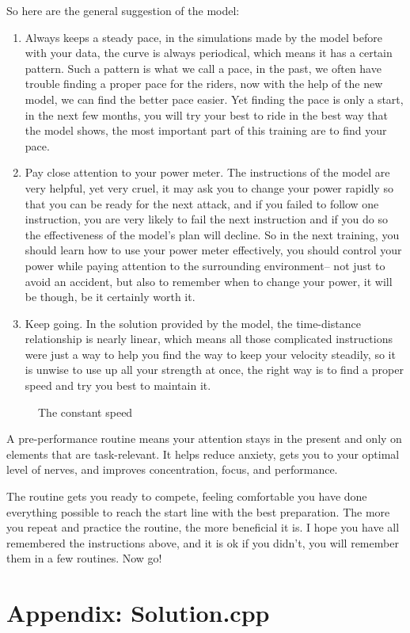 \documentclass[12pt]{article}
\begin{document}
So here are the general suggestion of the model:
\begin{enumerate}
    \item Always keeps a steady pace, in the simulations made by the model before with your data, the curve is always periodical, which means it has a certain pattern. Such a
          pattern is what we call a pace, in the past, we often have trouble finding a proper pace for the riders, now with the help of the new model, we can find the
          better pace easier. Yet finding the pace is only a start, in the next few months, you will try your best to ride in the best way that the model shows, the most important part of this training are to find your pace.
    \item  Pay close attention to your power meter. The instructions of the model are very helpful, yet very cruel, it may ask you to change your
          power rapidly so that you can be ready for the next attack, and if you failed to follow one instruction, you are very likely to fail the next instruction and if you do so
          the effectiveness of the model's plan will decline.  So in the next training, you should learn how to use your power meter effectively, you should control your power while
          paying attention to the surrounding environment-- not just to avoid an accident, but also to remember when to change your power, it will be though, be it certainly worth it.
    \item Keep going. In the solution provided by the model, the time-distance relationship is nearly linear, which means all those complicated instructions were just a way to help
          you find the way to keep your velocity steadily, so it is unwise to use up all your strength at once, the right way is to find a proper speed and try you best to maintain
          it.
\end{enumerate}

\begin{figure}[H]
    \centering

    \caption{The constant speed}
\end{figure}
A pre-performance routine means your attention stays in the present and only on elements that are task-relevant. It helps reduce anxiety, gets you to your optimal level
of nerves, and improves concentration, focus, and performance.

The routine gets you ready to compete, feeling comfortable you have done everything possible to reach the start line with the best preparation. The more you repeat and
practice the routine, the more beneficial it is. I hope you have all remembered the instructions above, and it is ok if you didn't, you will remember them in a few routines.
Now go!






\section{Appendix: Solution.cpp}



\end{document}
